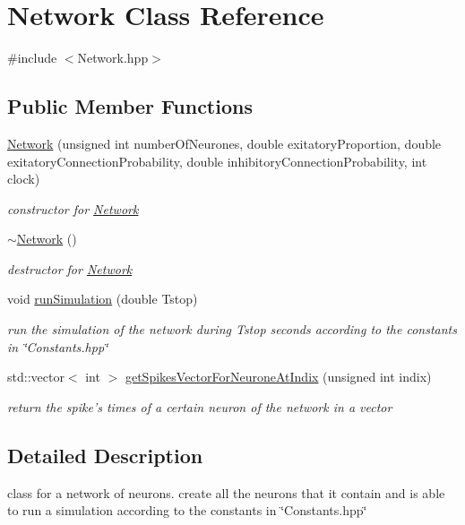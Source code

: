 \hypertarget{classNetwork}{\section{Network Class Reference}
\label{classNetwork}
}


{\ttfamily \#include $<$Network.\-hpp$>$}

\subsection*{Public Member Functions}
\begin{DoxyCompactItemize}
\item 
\hyperlink{classNetwork_a50ca39356b9602a77a03c1c75136715f}{Network} (unsigned int number\-Of\-Neurones, double exitatory\-Proportion, double exitatory\-Connection\-Probability, double inhibitory\-Connection\-Probability, int clock)
\begin{DoxyCompactList}\small\item\em constructor for \hyperlink{classNetwork}{Network} \end{DoxyCompactList}\item 
\hyperlink{classNetwork_a7a4e19cdb4bf0c7ecf82baa643831492}{$\sim$\-Network} ()
\begin{DoxyCompactList}\small\item\em destructor for \hyperlink{classNetwork}{Network} \end{DoxyCompactList}\item 
void \hyperlink{classNetwork_ab8511393231eb31d5ea30d111f74c9ab}{run\-Simulation} (double Tstop)
\begin{DoxyCompactList}\small\item\em run the simulation of the network during Tstop seconds according to the constants in \char`\"{}\-Constants.\-hpp\char`\"{} \end{DoxyCompactList}\item 
std\-::vector$<$ int $>$ \hyperlink{classNetwork_a37f408d5ff245c828e8fe74a4d7fdefd}{get\-Spikes\-Vector\-For\-Neurone\-At\-Indix} (unsigned int indix)
\begin{DoxyCompactList}\small\item\em return the spike's times of a certain neuron of the network in a vector \end{DoxyCompactList}\end{DoxyCompactItemize}


\subsection{Detailed Description}
class for a network of neurons. create all the neurons that it contain and is able to run a simulation according to the constants in \char`\"{}\-Constants.\-hpp\char`\"{} 

